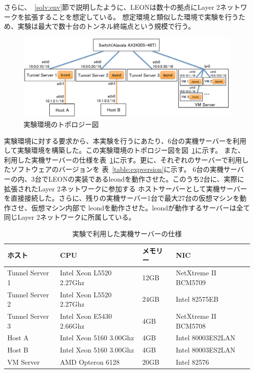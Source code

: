 さらに、~\ref{solv:env}節で説明したように、LEONは数十の拠点にLayer 2ネットワークを拡張することを想定している。
想定環境と類似した環境で実験を行うため、実験は最大で数十台のトンネル終端点という規模で行う。

\begin{figure}
	\begin{center}
		\includegraphics[scale=0.65]{./img/experimenttopology}
		\caption{実験環境のトポロジー図}
		\label{img:experimenttopology}
	\end{center}
\end{figure}

実験環境に対する要求から、本実験を行うにあたり、6台の実機サーバーを利用して実験環境を構築した。この実験環境のトポロジー図を図~\ref{img:experimenttopology}に示す。
また、利用した実機サーバーの仕様を表~\ref{table:expserv}に示す。更に、それぞれのサーバーで利用したソフトウェアのバージョンを
表~\ref{table:expversion}に示す。
6台の実機サーバーの内、3台でLEONの実装であるleondを動作させた。このうち2台に、実際に拡張されたLayer 2ネットワークに参加する
ホストサーバーとして実機サーバーを直接接続した。さらに、残りの実機サーバー1台で最大27台の仮想マシンを動作させ、仮想マシン内部で
leondを動作させた。leondが動作するサーバーは全て同じLayer 2ネットワークに所属している。

\begin{table}[h]
\begin{center}
	\caption{実験で利用した実機サーバーの仕様}
	\begin{tabular}{|l|l|l|l|}
		\hline
		ホスト & CPU & メモリー & NIC \\
		\hline
		\hline
		Tunnel Server 1 & Intel Xeon L5520 2.27Ghz & 12GB & NetXtreme II BCM5709 \\
		\hline
		Tunnel Server 2 & Intel Xeon L5520 2.27Ghz & 24GB & Intel 82575EB \\
		\hline
		Tunnel Server 3 & Intel Xeon E5430 2.66Ghz & 4GB & NetXtreme II BCM5708 \\
		\hline
		Host A & Intel Xeon 5160 3.00Ghz & 4GB & Intel 80003ES2LAN \\
		\hline
		Host B & Intel Xeon 5160 3.00Ghz & 4GB & Intel 80003ES2LAN \\
		\hline
		VM Server & AMD Opteron 6128 & 20GB & Intel 82576 \\
		\hline
	\end{tabular}
	\label{table:expserv}
\end{center}
\end{table}

